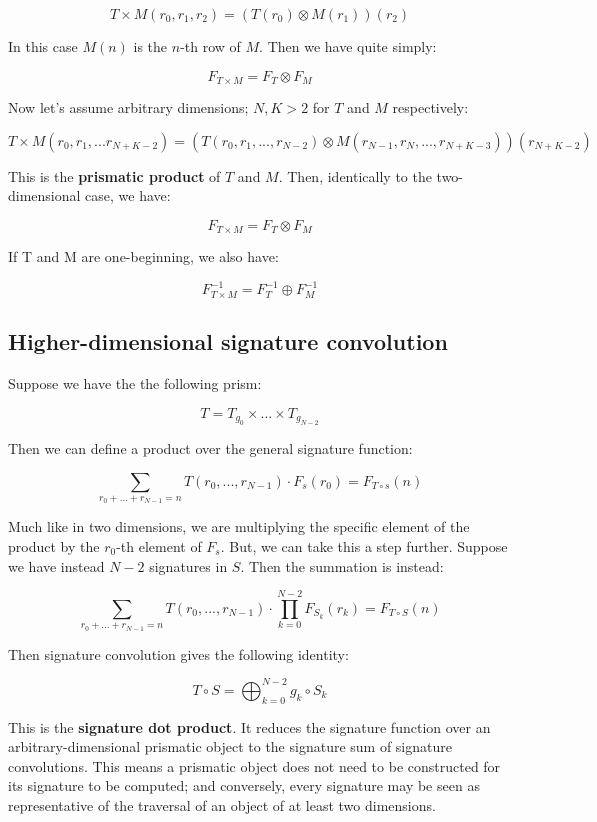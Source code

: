 \documentclass{article}
\begin{document}
$$T \times M (r_0, r_1, r_2) = (T(r_0) \otimes M (r_1)) (r_2)$$

\noindent In this case $M(n)$ is the $n$-th row of $M$. Then we have quite simply:

$$F_{T \times M} = F_T \otimes F_M$$

\noindent Now let's assume arbitrary dimensions; $N, K > 2$ for $T$ and $M$ respectively:

$$T \times M (r_0, r_1, ... r_{N + K - 2}) = \left( T(r_0, r_1, ..., r_{N - 2}) \otimes M (r_{N-1}, r_N, ..., r_{N + K - 3}) \right) (r_{N + K - 2})$$

\noindent This is the \textbf{prismatic product} of $T$ and $M$. Then, identically to the two-dimensional case, we have:

$$F_{T \times M} = F_T \otimes F_M$$

\noindent If T and M are one-beginning, we also have:

$$F_{T \times M}^{-1} = F_T^{-1} \oplus F_M^{-1}$$

\subsection{Higher-dimensional signature convolution}

\noindent Suppose we have the the following prism:

$$T = T_{g_0} \times ... \times T_{g_{N-2}}$$

\noindent Then we can define a product over the general signature function:

$$\sum_{r_0 + ... + r_{N-1} = n} T (r_0, ... , r_{N-1}) \cdot F_{s} (r_0) =F_{T \circ s}(n) $$

\noindent Much like in two dimensions, we are multiplying the specific element of the product by the $r_0$-th element of $F_s$. But, we can take this a step further. Suppose we have instead $N-2$ signatures in $S$. Then the summation is instead:

$$\sum_{r_0 + ... + r_{N-1} = n} T(r_0, ... , r_{N-1}) \cdot \prod_{k=0}^{N-2} F_{S_k} (r_k) = F_{T \circ S}(n) $$

\noindent Then signature convolution gives the following identity:

$$T \circ S = \bigoplus_{k=0}^{N-2} g_k \circ S_k$$

\noindent This is the \textbf{signature dot product}. It reduces the signature function over an arbitrary-dimensional prismatic object to the signature sum of signature convolutions. This means a prismatic object does not need to be constructed for its signature to be computed; and conversely, every signature may be seen as representative of the traversal of an object of at least two dimensions.
\end{document}
